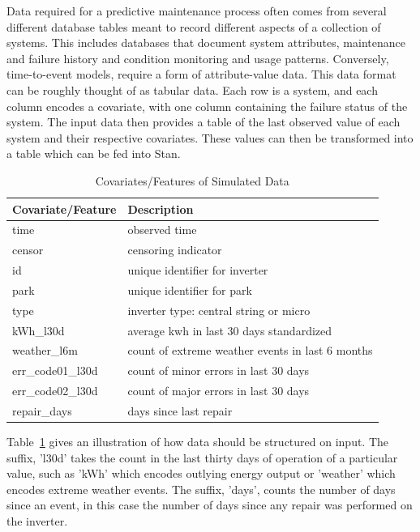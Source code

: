 Data required for a predictive maintenance process often comes from several different database tables meant to record different aspects of a collection of systems. This includes databases that document system attributes, maintenance and failure history and condition monitoring and usage patterns. Conversely, time-to-event models, require a form of attribute-value data. This data format can be roughly thought of as tabular data. Each row is a system, and each column encodes a covariate, with one column containing the failure status of the system. The input data then provides a table of the last observed value of each system and their respective covariates. These values can then be transformed into a table which can be fed into Stan. 



\begin{table}[htbp]
  \centering
    \begin{tabular}{l|l}
    \textbf{Covariate/Feature} & \textbf{Description} \\
    \hline
    time  & observed time \\
    censor & censoring indicator  \\
    id    & unique identifier for inverter \\
    park  & unique identifier for park \\
    type  & inverter type: central string or micro \\
    kWh\_l30d & average kwh in last 30 days standardized \\
    weather\_l6m & count of extreme weather events in last 6 months \\
    err\_code01\_l30d & count of minor errors in last 30 days \\
    err\_code02\_l30d & count of major errors in last 30 days \\
    repair\_days & days since last repair \\
    \end{tabular}%
  \caption{Covariates/Features of Simulated Data}
  \label{dat_vars}%
\end{table}%



Table~\ref{dat_vars} gives an illustration of how data should be structured on input. The suffix, 'l30d' takes the count in the last thirty days of operation of a particular value, such as 'kWh' which encodes outlying energy output or 'weather' which encodes extreme weather events. The suffix, 'days', counts the number of days since an event, in this case the number of days since any repair was performed on the inverter. 

